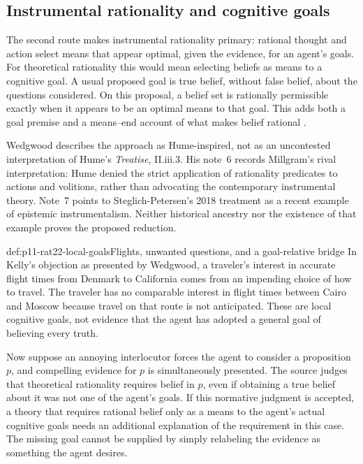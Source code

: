 \subsection{Instrumental rationality and cognitive goals}

The second route makes instrumental rationality primary: rational thought
and action select means that appear optimal, given the evidence, for an
agent's goals. For theoretical rationality this would mean selecting
beliefs as means to a cognitive goal. A usual proposed goal is true belief,
without false belief, about the questions considered. On this proposal,
a belief set is rationally permissible exactly when it appears to be an
optimal means to that goal. This adds both a goal premise and a means--end
account of what makes belief rational
\parencite[p.~141]{RalphWedgwood2021}.

Wedgwood describes the approach as Hume-inspired, not as an uncontested
interpretation of Hume's \emph{Treatise}, II.iii.3. His note~6 records
Millgram's rival interpretation: Hume denied the strict application of
rationality predicates to actions and volitions, rather than advocating
the contemporary instrumental theory. Note~7 points to
Steglich-Petersen's 2018 treatment as a recent example of epistemic
instrumentalism. Neither historical ancestry nor the existence of that
example proves the proposed reduction.

\begin{hbexample}{def:p11-rat22-local-goals}{Flights, unwanted questions, and a goal-relative bridge}
In Kelly's objection as presented by Wedgwood, a traveler's interest in
accurate flight times from Denmark to California comes from an impending
choice of how to travel. The traveler has no comparable interest in flight
times between Cairo and Moscow because travel on that route is not
anticipated. These are local cognitive goals, not evidence that the agent
has adopted a general goal of believing every truth.

Now suppose an annoying interlocutor forces the agent to consider a
proposition \(p\), and compelling evidence for \(p\) is simultaneously
presented. The source judges that theoretical rationality requires belief
in \(p\), even if obtaining a true belief about it was not one of the
agent's goals. If this normative judgment is accepted, a theory that
requires rational belief only as a means to the agent's actual cognitive
goals needs an additional explanation of the requirement in this case.
The missing goal cannot be supplied by simply relabeling the evidence as
something the agent desires.
\end{hbexample}

